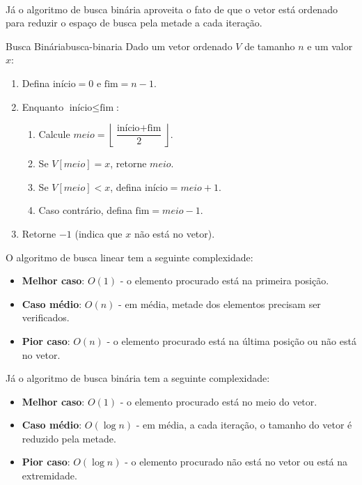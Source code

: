 \documentclass[12pt,a4paper]{article}
\begin{document}
\paragraph{}
Já o algoritmo de busca binária aproveita o fato de que o vetor está ordenado para reduzir o espaço de busca pela metade a cada iteração.

\begin{algobox}{Busca Binária}{busca-binaria}
Dado um vetor ordenado \(V\) de tamanho \(n\) e um valor \(x\):
\begin{enumerate}\setlength{\itemsep}{2pt}
    \item Defina \(\text{início} = 0\) e \(\text{fim} = n - 1\).
    \item Enquanto \(\text{início} \leq \text{fim}\):
    \begin{enumerate}\setlength{\itemsep}{2pt}
        \item Calcule \(meio = \left\lfloor \dfrac{\text{início} + \text{fim}}{2} \right\rfloor\).
        \item Se \(V[meio] = x\), retorne \(meio\).
        \item Se \(V[meio] < x\), defina \(\text{início} = meio + 1\).
        \item Caso contrário, defina \(\text{fim} = meio - 1\).
    \end{enumerate}
    \item Retorne \(-1\) (indica que \(x\) não está no vetor).
\end{enumerate}
\end{algobox}  

O algoritmo de busca linear tem a seguinte complexidade:
\begin{itemize}\setlength{\itemsep}{2pt}
    \item \textbf{Melhor caso}: \(O(1)\) - o elemento procurado está na primeira posição.
    \item \textbf{Caso médio}: \(O(n)\) - em média, metade dos elementos precisam ser verificados.
    \item \textbf{Pior caso}: \(O(n)\) - o elemento procurado está na última posição ou não está no vetor.
\end{itemize}

Já o algoritmo de busca binária tem a seguinte complexidade:
\begin{itemize}\setlength{\itemsep}{2pt}
    \item \textbf{Melhor caso}: \(O(1)\) - o elemento procurado está no meio do vetor.
    \item \textbf{Caso médio}: \(O(\log n)\) - em média, a cada iteração, o tamanho do vetor é reduzido pela metade.
    \item \textbf{Pior caso}: \(O(\log n)\) - o elemento procurado não está no vetor ou está na extremidade.
\end{itemize}
 
\end{document}
